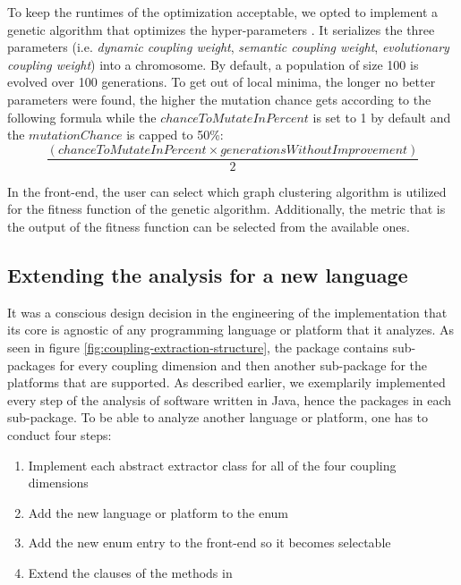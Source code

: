 \documentclass[12pt,a4paper]{report}
\begin{document}
To keep the runtimes of the optimization acceptable, we opted to implement a
genetic algorithm that optimizes the hyper\hyp parameters \cite{
eiben2003introduction}. It serializes the three parameters (i.e. \textit{
dynamic coupling weight}, \textit{semantic coupling weight}, \textit{
evolutionary coupling weight}) into a chromosome. By default, a population of
size 100 is evolved over 100 generations. To get out of local minima, the
longer no better parameters were found, the higher the mutation chance gets
according to the following formula while the $chanceToMutateInPercent$ is set
to 1 by default and the $mutationChance$ is capped to 50\%:
\[
  \frac{(chanceToMutateInPercent \times generationsWithoutImprovement)}{2}
\]

In the front\hyp end, the user can select which graph clustering algorithm is
utilized for the fitness function of the genetic algorithm. Additionally, the
metric that is the output of the fitness function can be selected from the
available ones.


\subsection{Extending the analysis for a new language}

It was a conscious design decision in the engineering of the implementation
that its core is agnostic of any programming language or platform that it
analyzes. As seen in figure \ref{fig:coupling-extraction-structure}, the  package contains sub\hyp packages for every coupling
dimension and then another sub\hyp package for the platforms that are
supported. As described earlier, we exemplarily implemented every step of the
analysis of software written in Java, hence the  packages in each
 sub\hyp package. To be able to analyze another language or
platform, one has to conduct four steps:
\begin{enumerate}
    \item Implement each abstract extractor class for all of the four coupling dimensions
    \item Add the new language or platform to the  enum
    \item Add the new enum entry to the front-end so it becomes selectable
    \item Extend the clauses of the methods in 
\end{enumerate}
\end{document}
